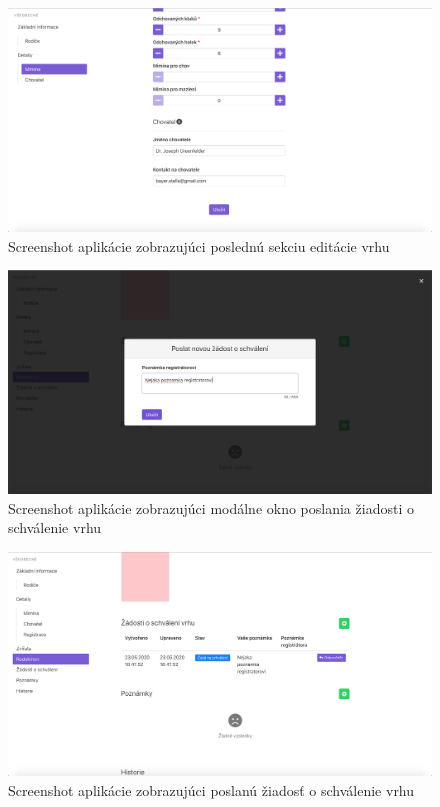 \begin{figure}[H]
	\includegraphics[width=1.0\textwidth]{media/priloha/vrh/editacia/3.png}
	\caption{Screenshot aplikácie zobrazujúci poslednú sekciu editácie vrhu}
\end{figure}

\vspace*{\fill}

\begin{figure}[H]
	\includegraphics[width=1.0\textwidth]{media/priloha/vrh/ziadost/1.png}
	\caption{Screenshot aplikácie zobrazujúci modálne okno poslania žiadosti o schválenie vrhu}
\end{figure}

\begin{figure}[H]
	\includegraphics[width=1.0\textwidth]{media/priloha/vrh/ziadost/2.png}
	\caption{Screenshot aplikácie zobrazujúci poslanú žiadosť o schválenie vrhu}
\end{figure}

